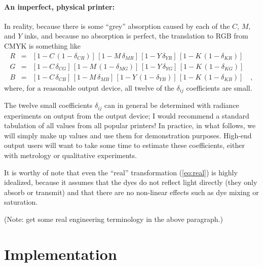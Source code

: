 \documentclass[letterpaper,preprint,dvipdf]{aastex}
\begin{document}
\paragraph{An imperfect, physical printer:}
In reality, because there is some ``grey'' absorption caused by each
of the $C$, $M$, and $Y$ inks, and because no absorption is perfect,
the translation to RGB from CMYK is something like
\begin{eqnarray}\displaystyle
R & = & [1-C\,(1-\delta_{CR})]\,
        [1-M\,\delta_{MR}]\,
        [1-Y\,\delta_{YR}]\,
        [1-K\,(1-\delta_{KR})] \nonumber \\
G & = & [1-C\,\delta_{CG}]\,
        [1-M\,(1-\delta_{MG})]\,
        [1-Y\,\delta_{YG}]\,
        [1-K\,(1-\delta_{KG})] \nonumber \\
B & = & [1-C\,\delta_{CB}]\,
        [1-M\,\delta_{MB}]\,
        [1-Y\,(1-\delta_{YB})]\,
        [1-K\,(1-\delta_{KB})] \quad ,
\label{eq:real}
\end{eqnarray}
where, for a reasonable output device, all twelve of the
$\delta_{ij}$ coefficients are small.

The twelve small coefficients $\delta_{ij}$ can in general be
determined with radiance experiments on output from the output device;
I would recommend a standard tabulation of all values from all popular
printers!  In practice, in what follows, we will simply make up values
and use them for demonstration purposes.  High-end output users will
want to take some time to estimate these coefficients, either with
metrology or qualitative experiments.

It is worthy of note that even the ``real'' transformation
(\ref{eq:real}) is highly idealized, because it assumes that the dyes
do not reflect light directly (they only absorb or transmit) and that
there are no non-linear effects such as dye mixing or saturation.

(Note: get some real engineering terminology in the above paragraph.)

\section{Implementation}
\end{document}
